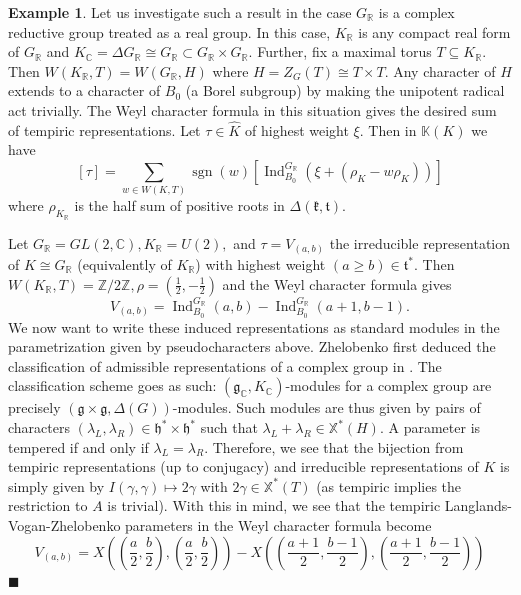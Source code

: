 \documentclass[letterpaper,twosided,11pt]{article}
\theoremstyle{plain}
\theoremstyle{definition}
\newtheorem{example}{Example}
\theoremstyle{remark}
\newcommand{\C}{\mathbb{C}}
\newcommand{\R}{\mathbb{R}}
\newcommand{\Z}{\mathbb{Z}}
\newcommand{\lrp}[1]{\left ( #1 \right ) }
\newcommand{\Ind}{\operatorname{Ind}}
\newcommand{\lie}[1]{\mathfrak{#1}}
\begin{document}
	\begin{example}\label{K_as_Tempiric_Example}
	Let us investigate such a result in the case $G_\R$ is a complex reductive group treated as a real group. In this case, $K_\R$ is any compact real form of $G_\R$ and $K_\C=\Delta G_\R\cong G_\R\subset G_\R\times G_\R.$ Further, fix a maximal torus $T\subseteq K_\R.$ Then $W(K_\R,T)=W(G_\R,H)$ where $H=Z_G(T)\cong T\times T.$ Any character of $H$ extends to a character of $B_0$ (a Borel subgroup) by making the unipotent radical act trivially.  The Weyl character formula in this situation gives the desired sum of tempiric representations. Let $\tau\in \widehat{K}$ of highest weight $\xi.$ Then in $\mathbb{K}(K)$ we have \[ [\tau]=\sum_{w\in W(K,T)} \operatorname{sgn}(w)[\Ind_{B_0}^{G_\R}(\xi+(\rho_{K}-w\rho_{K}))] \]
	where $\rho_{K_\R}$ is the half sum of positive roots in $\Delta(\lie{k},\lie{t}).$ 
	   
	   Let $G_\R=GL(2,\C), K_\R=U(2),$ and $\tau=V_{(a,b)}$ the irreducible representation of $K\cong G_\R$ (equivalently of $K_\R$) with highest weight $(a\geq b)\in \lie{t}^*.$ Then $W(K_\R,T)=\Z/2\Z, \rho=(\frac{1}{2},-\frac{1}{2})$ and the Weyl character formula gives \[ V_{(a,b)}=\Ind_{B_0}^{G_\R}(a,b)-\Ind_{B_0}^{G_\R}(a+1,b-1). \]
	   We now want to write these induced representations as standard modules in the parametrization given by pseudocharacters above. Zhelobenko first deduced the classification of admissible representations of a complex group in \cite{Zhelobenko1974}. The classification scheme goes as such: $(\lie{g}_\C,K_\C)$-modules for a complex group are precisely $(\lie{g}\times \lie{g}, \Delta(G))$-modules. Such modules are thus given by pairs of characters $(\lambda_L,\lambda_R)\in \lie{h}^*\times \lie{h}^*$ such that $\lambda_L+\lambda_R\in \mathbb{X}^*(H).$ A parameter is tempered if and only if $\lambda_L=\lambda_R.$ Therefore, we see that the bijection from tempiric representations (up to conjugacy) and irreducible representations of $K$ is simply given by $I(\gamma,\gamma)\mapsto 2\gamma$ with $2\gamma\in \mathbb{X}^*(T)$ (as tempiric implies the restriction to $A$ is trivial). 
	   With this in mind, we see that the tempiric Langlands-Vogan-Zhelobenko parameters in the Weyl character formula become \begin{equation}   V_{(a,b)}=X\left(\left(\frac{a}{2},\frac b 2\right),\left(\frac a 2,\frac b 2\right)\right)-X\left(\lrp{\frac{a+1}{2},\frac{b-1}{2}},\lrp{\frac{a+1}{2},\frac{b-1}{2}}\right )  \end{equation} 
	   \hfill $\blacksquare$
	 
	\end{example} 
	
\end{document}
